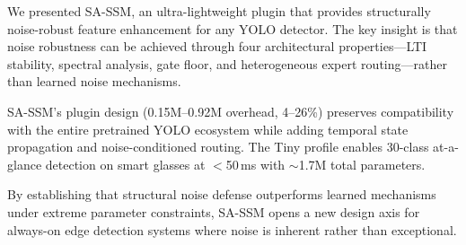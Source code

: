 \documentclass[conference]{IEEEtran}
\begin{document}
We presented SA-SSM, an ultra-lightweight plugin that provides structurally noise-robust feature enhancement for any YOLO detector. The key insight is that noise robustness can be achieved through four architectural properties---LTI stability, spectral analysis, gate floor, and heterogeneous expert routing---rather than learned noise mechanisms.

SA-SSM's plugin design (0.15M--0.92M overhead, 4--26\%) preserves compatibility with the entire pretrained YOLO ecosystem while adding temporal state propagation and noise-conditioned routing. The Tiny profile enables 30-class at-a-glance detection on smart glasses at $<$50\,ms with $\sim$1.7M total parameters.

By establishing that structural noise defense outperforms learned mechanisms under extreme parameter constraints, SA-SSM opens a new design axis for always-on edge detection systems where noise is inherent rather than exceptional.
\end{document}
